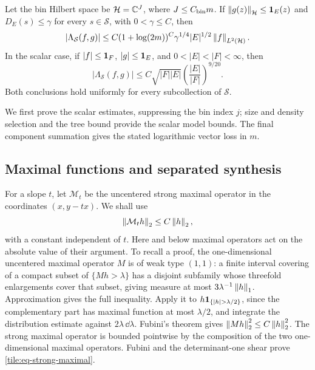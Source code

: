 \begin{proposition}\label{tile:prop-model}
Let the bin Hilbert space be \(\mathcal H=\mathbb C^J\), where
\(J\leq C_{\rm bin}m\).  If \(\left\|g(z)\right\|_{\mathcal H}\leq\mathbf 1_E(z)\)
and \(D_E(s)\leq\gamma\) for every \(s\in\mathcal S\), with
\(0<\gamma\leq C\), then
\begin{equation}\label{eq:src-4}
 |\Lambda_{\mathcal S}(f,g)|
 \leq C(1+\log(2m))^C\gamma^{1/4}
             |E|^{1/2}\left\|f\right\|_{L^2(\mathcal H)}.
\end{equation}
In the scalar case, if \(|f|\leq\mathbf 1_F\), \(|g|\leq\mathbf 1_E\), and
\(0<|E|<|F|<\infty\), then
\begin{equation}\label{tile:eq-reverse-disparity}
 |\Lambda_{\mathcal S}(f,g)|
 \leq C\sqrt{|F||E|}
                \left(\frac{|E|}{|F|}\right)^{9/20}.
\end{equation}
Both conclusions hold uniformly for every subcollection of
\(\mathcal S\).
\end{proposition}

We first prove the scalar estimates, suppressing the bin index \(j\);
size and density selection and the tree bound provide the scalar model
bounds. The final component summation gives the stated logarithmic
vector loss in \(m\).

\subsection{Maximal functions and separated synthesis}

For a slope \(t\), let \(\mathcal M_t\) be the uncentered strong
maximal operator in the coordinates \((x,y-tx)\).  We shall use
\begin{equation}\label{tile:eq-strong-maximal}
 \left\|\mathcal M_t h\right\|_2\leq C\left\|h\right\|_2,
\end{equation}
with a constant independent of \(t\).  Here and below maximal
operators act on the absolute value of their argument.  To recall a
proof, the one-dimensional uncentered maximal operator \(M\) is of
weak type \((1,1)\): a finite interval covering of a compact subset
of \(\{Mh>\lambda\}\) has a disjoint subfamily whose threefold
enlargements cover that subset, giving measure at most
\(3\lambda^{-1}\left\|h\right\|_1\).  Approximation gives the full
inequality.  Apply it to
\(h\one_{\{|h|>\lambda/2\}}\), since the complementary part has
maximal function at most \(\lambda/2\), and integrate the
distribution estimate against \(2\lambda\,\dd\lambda\).
Fubini's theorem gives \(\left\|Mh\right\|_2^2\leq C\left\|h\right\|_2^2\).
The strong maximal operator is bounded pointwise by the composition
of the two one-dimensional maximal operators.  Fubini and the
determinant-one shear prove \eqref{tile:eq-strong-maximal}.

